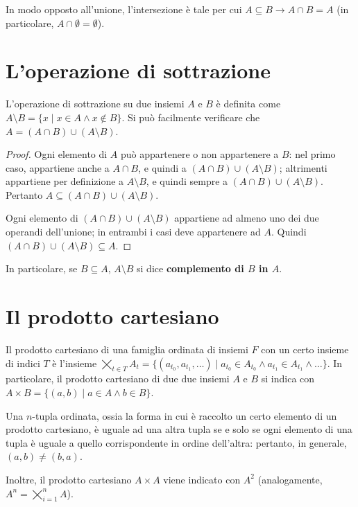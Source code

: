 In modo opposto all'unione, l'intersezione è tale per cui $A \subseteq B \rightarrow
    A \cap B = A$ (in particolare, $A \cap \emptyset = \emptyset$).

\section{L'operazione di sottrazione}

L'operazione di sottrazione su due insiemi $A$ e $B$ è definita come
$A \setminus B = \{x \mid x \in A \land x \notin B\}$. Si può facilmente
verificare che $A = (A \cap B) \cup (A \setminus B)$.

\begin{proof}
    Ogni elemento di $A$ può appartenere o non appartenere a $B$: nel primo caso,
    appartiene anche a $A \cap B$, e quindi a $(A \cap B) \cup (A \setminus B)$;
    altrimenti appartiene per definizione a $A \setminus B$, e quindi sempre
    a $(A \cap B) \cup (A \setminus B)$. Pertanto $A \subseteq (A \cap B) \cup (A \setminus B)$.

    Ogni elemento di $(A \cap B) \cup (A \setminus B)$ appartiene ad almeno uno
    dei due operandi dell'unione; in entrambi i casi deve appartenere ad $A$. Quindi
    $(A \cap B) \cup (A \setminus B) \subseteq A$.
\end{proof}

In particolare, se $B \subseteq A$, $A \setminus B$ si dice \textbf{complemento di $B$ in $A$}.

\section{Il prodotto cartesiano}

Il prodotto cartesiano di una famiglia ordinata di insiemi $F$ con un certo insieme
di indici $T$ è l'insieme
$\bigtimes_{t \in T} A_t = \{(a_{t_0}, a_{t_1}, \ldots) \mid a_{t_0} \in A_{t_0} \land
    a_{t_1} \in A_{t_1} \land \ldots\}$. In particolare, il prodotto cartesiano di
due due insiemi $A$ e $B$ si indica con $A \times B = \{(a, b) \mid a \in A \land b \in B\}$.

Una $n$-tupla ordinata, ossia la forma in cui è raccolto un certo elemento di un prodotto cartesiano,
è uguale ad una altra tupla se e solo se ogni elemento di una tupla è uguale a quello
corrispondente in ordine dell'altra: pertanto, in generale, $(a, b) \neq (b, a)$.

Inoltre, il prodotto cartesiano $A \times A$ viene indicato con $A^2$ (analogamente,
$A^n = \bigtimes_{i=1}^{n} A$).